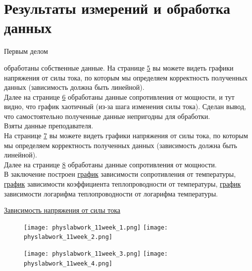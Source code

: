 \documentclass[a4paper,12pt]{article} %
\begin{document}
\newpage
\section{Результаты измерений и обработка данных}
\hypertarget{p4}{Первым делом} обработаны собственные данные. На странице \hyperlink{p5}{5} вы можете видеть графики напряжения от силы тока, по которым мы определяем корректность полученных данных (зависимость должна быть линейной). \\
Далее на странице \hyperlink{p6}{6} обработаны данные сопротивления от мощности, и тут видно, что график хаотичный (из-за шага изменения силы тока). Сделан вывод, что самостоятельно полученные данные непригодны для обработки. \\
Взяты данные преподавателя. \\
На странице \hyperlink{p7}{7} вы можете видеть графики напряжения от силы тока, по которым мы определяем корректность полученных данных (зависимость должна быть линейной). \\
Далее на странице \hyperlink{p8}{8} обработаны данные сопротивления от мощности. \\
В заключение построен \hyperlink{p91}{график} зависимости сопротивления от температуры, \hyperlink{p92}{график} зависимости коэффициента теплопроводности от температуры, \hyperlink{p93}{график} зависимости логарифма теплопроводности от логарифма температуры.


\hypertarget{p5}{\hyperlink{p4}{Зависимость напряжения от силы тока}} 

\begin{figure}[h!]
\begin{floatrow}
         {\texttt{[image: physlabwork\_11week\_1.png]}}
         {\texttt{[image: physlabwork\_11week\_2.png]}}         
\end{floatrow}
\end{figure}

\begin{figure}[h!]
\begin{floatrow}
         {\texttt{[image: physlabwork\_11week\_3.png]}}
         {\texttt{[image: physlabwork\_11week\_4.png]}}         
\end{floatrow}
\end{figure}
\end{document}
